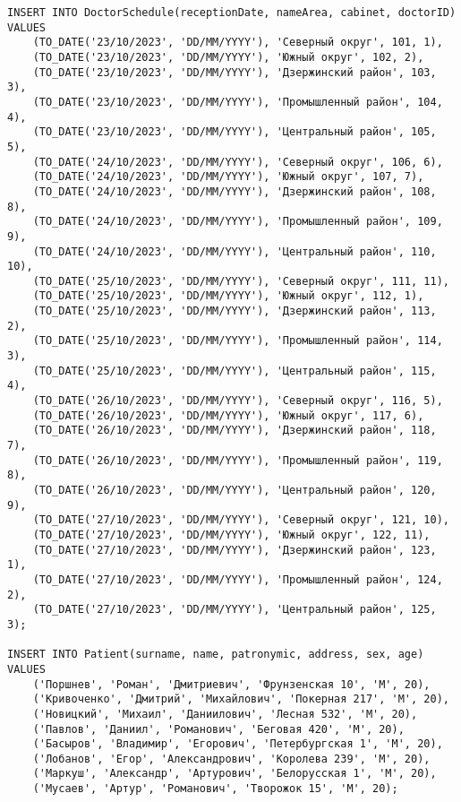 \documentclass{article}
\begin{document}
{\begin{verbatim}
INSERT INTO DoctorSchedule(receptionDate, nameArea, cabinet, doctorID)
VALUES 
    (TO_DATE('23/10/2023', 'DD/MM/YYYY'), 'Северный округ', 101, 1),
    (TO_DATE('23/10/2023', 'DD/MM/YYYY'), 'Южный округ', 102, 2),
    (TO_DATE('23/10/2023', 'DD/MM/YYYY'), 'Дзержинский район', 103, 3),
    (TO_DATE('23/10/2023', 'DD/MM/YYYY'), 'Промышленный район', 104, 4),
    (TO_DATE('23/10/2023', 'DD/MM/YYYY'), 'Центральный район', 105, 5),
    (TO_DATE('24/10/2023', 'DD/MM/YYYY'), 'Северный округ', 106, 6),
    (TO_DATE('24/10/2023', 'DD/MM/YYYY'), 'Южный округ', 107, 7),
    (TO_DATE('24/10/2023', 'DD/MM/YYYY'), 'Дзержинский район', 108, 8),
    (TO_DATE('24/10/2023', 'DD/MM/YYYY'), 'Промышленный район', 109, 9),
    (TO_DATE('24/10/2023', 'DD/MM/YYYY'), 'Центральный район', 110, 10),
    (TO_DATE('25/10/2023', 'DD/MM/YYYY'), 'Северный округ', 111, 11),
    (TO_DATE('25/10/2023', 'DD/MM/YYYY'), 'Южный округ', 112, 1),
    (TO_DATE('25/10/2023', 'DD/MM/YYYY'), 'Дзержинский район', 113, 2),
    (TO_DATE('25/10/2023', 'DD/MM/YYYY'), 'Промышленный район', 114, 3),
    (TO_DATE('25/10/2023', 'DD/MM/YYYY'), 'Центральный район', 115, 4),
    (TO_DATE('26/10/2023', 'DD/MM/YYYY'), 'Северный округ', 116, 5),
    (TO_DATE('26/10/2023', 'DD/MM/YYYY'), 'Южный округ', 117, 6),
    (TO_DATE('26/10/2023', 'DD/MM/YYYY'), 'Дзержинский район', 118, 7),
    (TO_DATE('26/10/2023', 'DD/MM/YYYY'), 'Промышленный район', 119, 8),
    (TO_DATE('26/10/2023', 'DD/MM/YYYY'), 'Центральный район', 120, 9),
    (TO_DATE('27/10/2023', 'DD/MM/YYYY'), 'Северный округ', 121, 10),
    (TO_DATE('27/10/2023', 'DD/MM/YYYY'), 'Южный округ', 122, 11),
    (TO_DATE('27/10/2023', 'DD/MM/YYYY'), 'Дзержинский район', 123, 1),
    (TO_DATE('27/10/2023', 'DD/MM/YYYY'), 'Промышленный район', 124, 2),
    (TO_DATE('27/10/2023', 'DD/MM/YYYY'), 'Центральный район', 125, 3);

INSERT INTO Patient(surname, name, patronymic, address, sex, age)
VALUES
	('Поршнев', 'Роман', 'Дмитриевич', 'Фрунзенская 10', 'М', 20),
	('Кривоченко', 'Дмитрий', 'Михайлович', 'Покерная 217', 'М', 20),
	('Новицкий', 'Михаил', 'Даниилович', 'Лесная 532', 'М', 20),
	('Павлов', 'Даниил', 'Романович', 'Беговая 420', 'М', 20),
	('Басыров', 'Владимир', 'Егорович', 'Петербургская 1', 'М', 20),
	('Лобанов', 'Егор', 'Александрович', 'Королева 239', 'М', 20),
	('Маркуш', 'Александр', 'Артурович', 'Белорусская 1', 'М', 20),
	('Мусаев', 'Артур', 'Романович', 'Творожок 15', 'М', 20);
	

\end{verbatim}}
\end{document}
